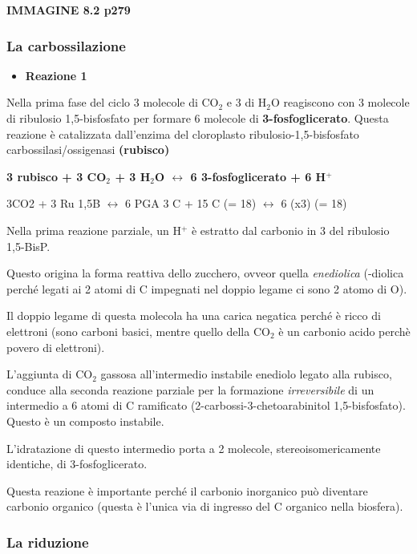 \documentclass[]{article}
\begin{document}
\textbf{IMMAGINE 8.2 p279}

\subsubsection{La carbossilazione}\label{la-carbossilazione}

\begin{itemize}
\itemsep1pt\parskip0pt
\item
  \textbf{Reazione 1}
\end{itemize}

Nella prima fase del ciclo 3 molecole di CO$_2$ e 3 di H$_2$O reagiscono
con 3 molecole di ribulosio 1,5-bisfosfato per formare 6 molecole di
\textbf{3-fosfoglicerato}. Questa reazione è catalizzata dall'enzima del
cloroplasto ribulosio-1,5-bisfosfato carbossilasi/ossigenasi
\textbf{(rubisco)}

\textbf{3 rubisco + 3 CO$_2$ + 3 H$_2$O $\leftrightarrow$ 6
3-fosfoglicerato + 6 H$^+$}

3CO2 + 3 Ru 1,5B $\leftrightarrow$ 6 PGA 3 C + 15 C (= 18)
$\leftrightarrow$ 6 (x3) (= 18)

Nella prima reazione parziale, un H$^+$ è estratto dal carbonio in 3 del
ribulosio 1,5-BisP.

Questo origina la forma reattiva dello zucchero, ovveor quella
\emph{enediolica} (-diolica perché legati ai 2 atomi di C impegnati nel
doppio legame ci sono 2 atomo di O).

Il doppio legame di questa molecola ha una carica negatica perché è
ricco di elettroni (sono carboni basici, mentre quello della CO$_2$ è un
carbonio acido perchè povero di elettroni).

L'aggiunta di CO$_2$ gassosa all'intermedio instabile enediolo legato
alla rubisco, conduce alla seconda reazione parziale per la formazione
\emph{irreversibile} di un intermedio a 6 atomi di C ramificato
(2-carbossi-3-chetoarabinitol 1,5-bisfosfato). Questo è un composto
instabile.

L'idratazione di questo intermedio porta a 2 molecole,
stereoisomericamente identiche, di 3-fosfoglicerato.

Questa reazione è importante perché il carbonio inorganico può diventare
carbonio organico (questa è l'unica via di ingresso del C organico nella
biosfera).

\subsubsection{La riduzione}\label{la-riduzione}
\end{document}
